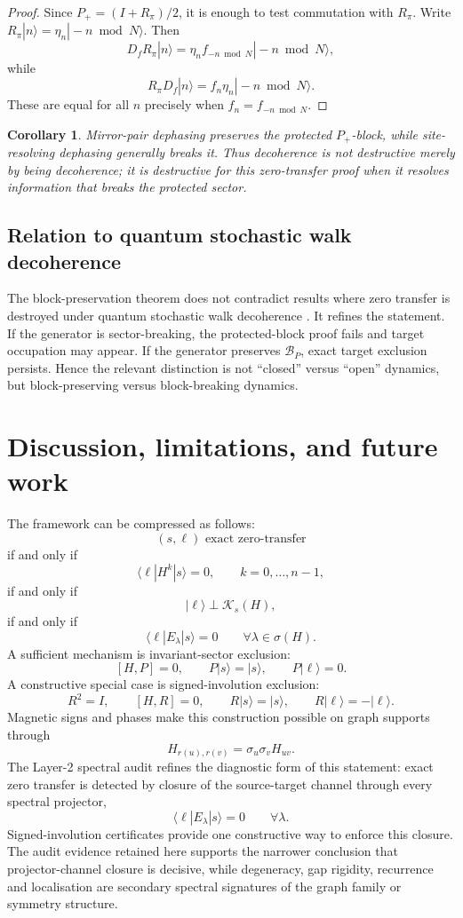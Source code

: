 \documentclass[11pt]{article}
\newtheorem{corollary}[theorem]{Corollary}
\theoremstyle{definition}
\newcommand{\cK}{\mathcal K}
\begin{document}
\begin{proof}
Since $P_+=(I+R_\pi)/2$, it is enough to test commutation with $R_\pi$. Write $R_\pi|n\rangle=\eta_n|-n\bmod N\rangle$. Then
\[
D_fR_\pi|n\rangle=\eta_nf_{-n\bmod N}|-n\bmod N\rangle,
\]
while
\[
R_\pi D_f|n\rangle=f_n\eta_n|-n\bmod N\rangle.
\]
These are equal for all $n$ precisely when $f_n=f_{-n\bmod N}$.
\end{proof}

\begin{corollary}
Mirror-pair dephasing preserves the protected $P_+$-block, while site-resolving dephasing generally breaks it. Thus decoherence is not destructive merely by being decoherence; it is destructive for this zero-transfer proof when it resolves information that breaks the protected sector.
\end{corollary}

\subsection{Relation to quantum stochastic walk decoherence}
The block-preservation theorem does not contradict results where zero transfer is destroyed under quantum stochastic walk decoherence \citep{Whitfield2010,Sett2019}. It refines the statement. If the generator is sector-breaking, the protected-block proof fails and target occupation may appear. If the generator preserves $\mathcal B_P$, exact target exclusion persists. Hence the relevant distinction is not ``closed'' versus ``open'' dynamics, but block-preserving versus block-breaking dynamics.

\section{Discussion, limitations, and future work}
The framework can be compressed as follows:
\[
(s,\ell)\text{ exact zero-transfer}
\]
if and only if
\[
\langle \ell|H^k|s\rangle=0,
\qquad k=0,\ldots,n-1,
\]
if and only if
\[
|\ell\rangle\perp\cK_s(H),
\]
if and only if
\[
\langle \ell|E_\lambda|s\rangle=0\qquad \forall \lambda\in\sigma(H).
\]
A sufficient mechanism is invariant-sector exclusion:
\[
[H,P]=0,
\qquad P|s\rangle=|s\rangle,
\qquad P|\ell\rangle=0.
\]
A constructive special case is signed-involution exclusion:
\[
R^2=I,
\qquad [H,R]=0,
\qquad R|s\rangle=|s\rangle,
\qquad R|\ell\rangle=-|\ell\rangle.
\]
Magnetic signs and phases make this construction possible on graph supports through
\[
H_{r(u),r(v)}=\sigma_u\sigma_vH_{uv}.
\]
The Layer-2 spectral audit refines the diagnostic form of this statement: exact zero transfer is detected by closure of the source-target channel through every spectral projector,
\[
\langle\ell|E_\lambda|s\rangle=0\qquad\forall\lambda.
\]
Signed-involution certificates provide one constructive way to enforce this closure.  The audit evidence retained here supports the narrower conclusion that projector-channel closure is decisive, while degeneracy, gap rigidity, recurrence and localisation are secondary spectral signatures of the graph family or symmetry structure.
\end{document}
